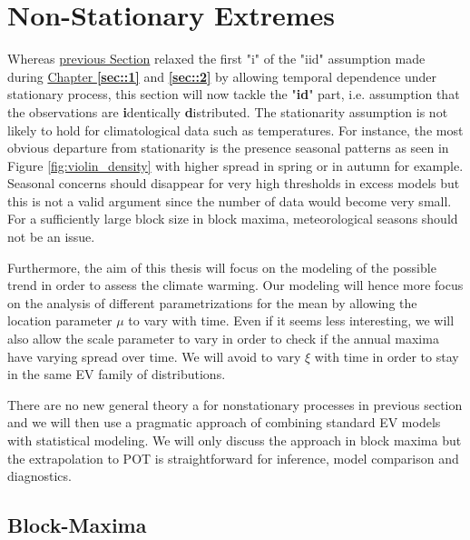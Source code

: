 \section{Non-Stationary Extremes}\label{nstatio}

Whereas \hyperref[sec:statio]{previous Section} relaxed the first "i" of the "iid" assumption made during  \hyperref[sec::1]{Chapter \textbf{\ref{sec::1}}} and \textbf{\ref{sec::2}} by allowing temporal dependence under stationary process, this section will now tackle the "\textbf{id}" part, i.e. assumption that the observations are \textbf{i}dentically \textbf{d}istributed. 
The stationarity assumption is not likely to hold for climatological data such as temperatures. For instance, the most obvious departure from stationarity is the presence seasonal patterns as seen in Figure \ref{fig:violin_density} with higher spread in spring or in autumn for example. Seasonal concerns should disappear for very high thresholds in excess models but this is not a valid argument since the number of data would become very small. For a sufficiently large block size in block maxima, meteorological seasons should not be an issue. 

Furthermore, the aim of this thesis will focus on the modeling of the possible trend in order to assess the climate warming. 
Our modeling will hence more focus on the analysis of different parametrizations for the mean by allowing the location parameter $\mu$ to vary with time. Even if it seems less interesting, we will also allow the scale parameter to vary in order to check if the annual maxima have varying spread over time. We will avoid to vary $\xi$ with time in order to stay in the same EV family of distributions.


There are no new general theory a for nonstationary processes in previous section  and we will then use a pragmatic approach of combining standard EV models with statistical modeling.
We will only discuss the approach in block maxima but the extrapolation to POT is straightforward for inference, model comparison and diagnostics.


\subsection{Block-Maxima}\label{sec:gev_nonstatio}

